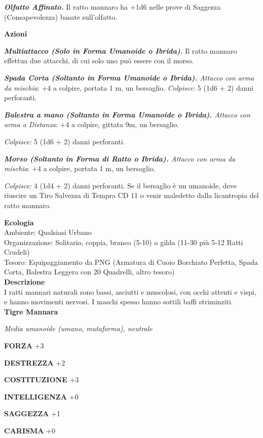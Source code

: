 \begin{multicols}{2}
\emph{\textbf{Olfatto Affinato.}} Il ratto mannaro ha +1d6 nelle prove di Saggezza (Consapevolezza) basate sull'olfatto.

\textbf{Azioni}

\emph{\textbf{Multiattacco (Solo in Forma Umanoide o Ibrida).}} Il ratto mannaro effettua due attacchi, di cui solo uno può essere con il morso.

\emph{\textbf{Spada Corta (Soltanto in Forma Umanoide o Ibrida).} Attacco con arma da mischia}: +4 a colpire, portata 1 m, un bersaglio. \emph{Colpisce:} 5 (1d6 + 2) danni perforanti.

\emph{\textbf{Balestra a mano (Soltanto in Forma Umanoide o Ibrida).} Attacco con arma a Distanza}: +4 a colpire, gittata 9m, un bersaglio.

\emph{Colpisce:} 5 (1d6 + 2) danni perforanti.

\emph{\textbf{Morso (Soltanto in Forma di Ratto o Ibrida).} Attacco con arma da mischia}: +4 a colpire, portata 1 m, un bersaglio.

\emph{Colpisce:} 4 (1d4 + 2) danni perforanti. Se il bersaglio è un umanoide, deve riuscire un Tiro Salvezza di Tempra CD 11 o venir maledetto dalla licantropia del ratto mannaro.

\textbf{Ecologia}\\
Ambiente: Qualsiasi Urbano\\
Organizzazione: Solitario, coppia, branco (5-10) o gilda (11-30 più 5-12 Ratti Crudeli)\\
Tesoro: Equipaggiamento da PNG (Armatura di Cuoio Borchiato Perfetta, Spada Corta, Balestra Leggera con 20 Quadrelli, altro tesoro)\\
\textbf{Descrizione}\\
I ratti mannari naturali sono bassi, asciutti e muscolosi, con occhi attenti e vispi, e hanno movimenti nervosi. I maschi spesso hanno sottili baffi striminziti.\\


\medskip{}\textbf{Tigre Mannara}

\emph{Media umanoide (umano, mutaforma), neutrale}

\textbf{FORZA} +3

\textbf{DESTREZZA} +2

\textbf{COSTITUZIONE} +3

\textbf{INTELLIGENZA} +0

\textbf{SAGGEZZA} +1

\textbf{CARISMA} +0


\end{multicols}
